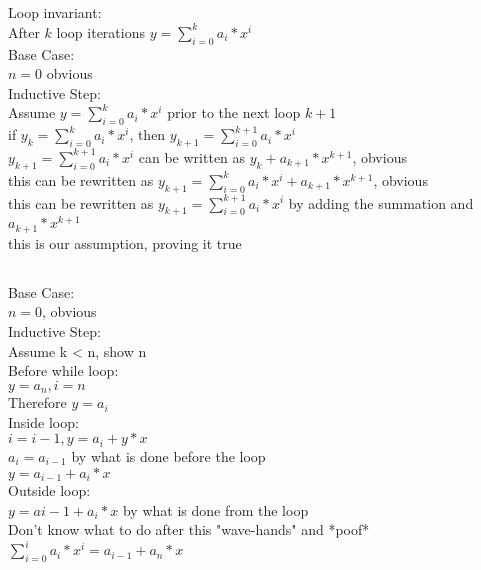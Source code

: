 \documentclass[letterpaper]{article}
\begin{document}
	\section{}
    	\subsection{}
        	Loop invariant:\\ After $k$ loop iterations $y = \displaystyle\sum_{i=0}^{k} a_{i}*x^{i}$ \\
            Base Case: \\ $n=0$ obvious \\
            Inductive Step: \\ Assume $y = \displaystyle\sum_{i=0}^{k} a_{i}*x^{i}$ prior to the next loop $k+1$ \\
            if $y_{k} = \displaystyle\sum_{i=0}^{k} a_{i}*x^{i}$, then $y_{k+1} = \displaystyle\sum_{i=0}^{k+1} a_{i}*x^{i}$ \\
			$y_{k+1} = \displaystyle\sum_{i=0}^{k+1} a_{i}*x^{i}$ can be written as $y_{k} + a_{k+1}*x^{k+1}$, obvious \\
            this can be rewritten as $y_{k+1} = \displaystyle\sum_{i=0}^{k} a_{i}*x^{i} + a_{k+1} * x^{k+1}$, obvious \\
            this can be rewritten as $y_{k+1} = \displaystyle\sum_{i=0}^{k+1} a_{i}*x^{i}$ by adding the summation and $a_{k+1} * x^{k+1}$ \\
            this is our assumption, proving it true
		\subsection{}
            Base Case: \\ $n=0$, obvious\\
            Inductive Step: \\ Assume k < n, show n \\
            Before while loop: \\ $y=a_n, i=n$\\
            Therefore $y=a_i$\\
            Inside loop: \\$i=i-1, y=a_{i} + y * x$\\
            $a_{i} = a_{i-1}$ by what is done before the loop\\
            $y = a_{i-1} + a_{i} * x$\\
            Outside loop: \\$y = a{i-1} + a_{i} * x$ by what is done from the loop\\
            Don't know what to do after this "wave-hands" and *poof* \\
            $\displaystyle\sum_{i=0}^{i} a_{i}*x^{i} = a_{i-1} + a_{n} * x$\\
\end{document}
